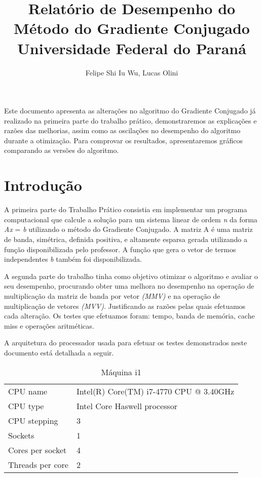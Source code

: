 \documentclass[12pt]{article}
\title{Relatório de Desempenho do Método do Gradiente Conjugado\\ Universidade Federal do Paraná}
\author{Felipe Shi Iu Wu\inst{1}, Lucas Olini\inst{1} }
\begin{document}
\maketitle

\begin{resumo}
  Este documento apresenta as alterações no algoritmo do Gradiente Conjugado já realizado na primeira parte do trabalho prático, demonstraremos as explicações e razões das melhorias, assim como as oscilações no desempenho do algoritmo durante a otimização. Para comprovar os resultados, apresentaremos gráficos comparando as versões do algoritmo.
\end{resumo}

\section{Introdução}

A primeira parte do Trabalho Prático consistia em implementar um programa computacional que calcule a solução para um sistema linear de ordem \textit{n} da forma \textit{Ax} = \textit{b} utilizando o método do Gradiente Conjugado. A matriz A é uma matriz de banda, simétrica, definida positiva, e altamente esparsa gerada utilizando a função disponibilizada pelo professor. A função que gera o vetor de termos independentes \textit{b} também foi disponibilizada.

A segunda parte do trabalho tinha como objetivo otimizar o algoritmo e avaliar o seu desempenho, procurando obter uma melhora no desempenho na operação de multiplicação da matriz de banda por vetor \textit{(MMV)} e na operação de multiplicação de vetores \textit{(MVV)}. Justificando as razões pelas quais efetuamos cada alteração. Os testes que efetuamos foram: tempo, banda de memória, cache miss e operações aritméticas.

A arquitetura do processador usada para efetuar os testes demonstrados neste documento está detalhada a seguir.

\begin{table}[H]
\centering
\caption{Máquina i1}
\label{my-label}
\begin{tabular}{ll}
CPU name         & Intel(R) Core(TM) i7-4770 CPU @ 3.40GHz \\
CPU type         & Intel Core Haswell processor            \\
CPU stepping     & 3                                       \\ \hline
Sockets          & 1                                       \\
Cores per socket & 4                                       \\
Threads per core & 2
\end{tabular}
\end{table}
\end{document}
